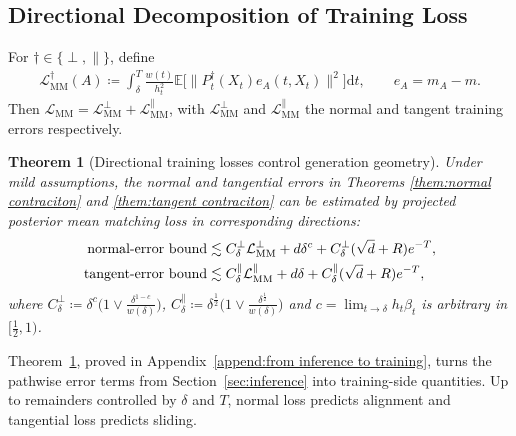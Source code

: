 \documentclass[11pt]{article}
\newcommand{\mb}{\mathbb}
\newcommand{\dee}{\mathrm{d}}
\newcommand{\mc}{\mathcal}
\newcommand{\MM}{\mc{L}_{\mathrm{MM}}}
\newtheorem{theorem}{Theorem}[section]
\begin{document}
\subsection{Directional Decomposition of Training Loss}\label{subsec:general transfer} 
For $\dagger\in\{\perp,\parallel\}$, define
\begin{align*}
    \MM^\dagger(A)
\coloneqq 
\int_\delta^T
\frac{w(t)}{h_t^2}
\mb E\big[\|P_t^\dagger(X_t)e_A(t,X_t)\|^2\big]\dee t,
\qquad e_A=m_A-m.
\end{align*}
Then $\MM=\MM^\perp+\MM^\parallel$, with $\MM^\perp$ and $\MM^\parallel$ the normal and tangent training errors respectively.
\begin{theorem}[Directional training losses control generation geometry]\label{thm:informal inference to training} Under mild assumptions, the normal and tangential errors in Theorems \ref{them:normal contraciton} and \ref{them:tangent contraciton} can be estimated by projected posterior mean matching loss in corresponding directions:
\begin{align*}
    \textnormal{normal-error bound} &\lesssim C_\delta^\perp\MM^\perp + d\delta^c + C_\delta^\perp(\sqrt{d}+R) e^{-T}, \\
    \textnormal{tangent-error bound} &\lesssim C_\delta^\parallel\MM^\parallel + d\delta + C_\delta^\parallel(\sqrt{d}+R)e^{-T},
\end{align*}   
where $C_\delta^\perp\coloneqq \delta^c  \big(1 \vee \frac{\delta^{1-c}}{w(\delta)}\big)$, $C_\delta^\parallel\coloneqq \delta^\frac{1}{2}  \big(1 \vee \frac{\delta^{\frac{1}{2}}}{w(\delta)}\big)$ and $c=\lim_{t\to\delta} h_t\beta_t$ is arbitrary in $[\tfrac{1}{2},1)$.
\end{theorem}
Theorem~\ref{thm:informal inference to training}, proved in Appendix~\ref{append:from inference to training}, turns the pathwise error terms from Section~\ref{sec:inference} into training-side quantities. Up to remainders controlled by $\delta$ and $T$, normal loss predicts alignment and tangential loss predicts sliding.
\end{document}
